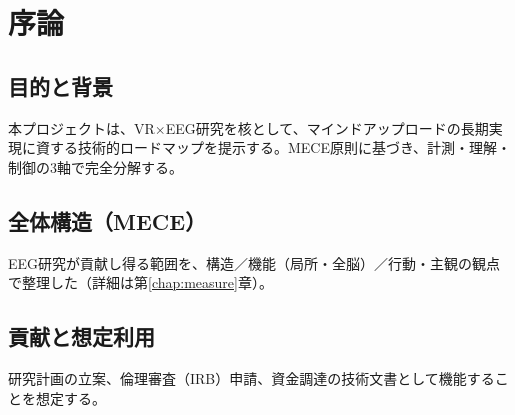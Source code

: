 \chapter{序論}
\section{目的と背景}
本プロジェクトは、VR\(\times\)EEG研究を核として、マインドアップロードの長期実現に資する技術的ロードマップを提示する。MECE原則に基づき、計測・理解・制御の3軸で完全分解する。

\section{全体構造（MECE）}
EEG研究が貢献し得る範囲を、構造／機能（局所・全脳）／行動・主観の観点で整理した（詳細は第\ref{chap:measure}章）。

\section{貢献と想定利用}
研究計画の立案、倫理審査（IRB）申請、資金調達の技術文書として機能することを想定する。


